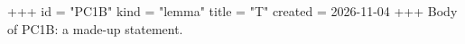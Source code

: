 +++
id = "PC1B"
kind = "lemma"
title = "T"
created = 2026-11-04
+++
Body of PC1B: a made-up statement.

